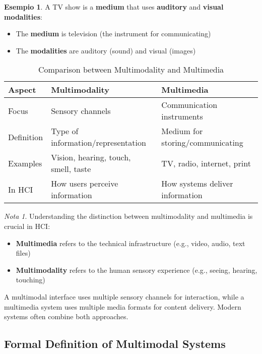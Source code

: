 \documentclass[11pt,a4paper]{article}
\theoremstyle{definition}
\newtheorem{example}{Esempio}[section]
\theoremstyle{plain}
\theoremstyle{remark}
\newtheorem*{remark}{Nota}
\begin{document}
\begin{example}
A TV show is a \textbf{medium} that uses \textbf{auditory} and \textbf{visual modalities}:
\begin{itemize}
    \item The \textbf{medium} is television (the instrument for communicating)
    \item The \textbf{modalities} are auditory (sound) and visual (images)
\end{itemize}
\end{example}

\begin{table}[h]
\centering
\begin{tabular}{|l|p{5cm}|p{5cm}|}
\hline
\textbf{Aspect} & \textbf{Multimodality} & \textbf{Multimedia} \\
\hline
Focus & Sensory channels & Communication instruments \\
\hline
Definition & Type of information/representation & Medium for storing/communicating \\
\hline
Examples & Vision, hearing, touch, smell, taste & TV, radio, internet, print \\
\hline
In HCI & How users perceive information & How systems deliver information \\
\hline
\end{tabular}
\caption{Comparison between Multimodality and Multimedia}
\end{table}

\begin{remark}
Understanding the distinction between multimodality and multimedia is crucial in HCI:
\begin{itemize}
    \item \textbf{Multimedia} refers to the technical infrastructure (e.g., video, audio, text files)
    \item \textbf{Multimodality} refers to the human sensory experience (e.g., seeing, hearing, touching)
\end{itemize}

A multimodal interface uses multiple sensory channels for interaction, while a multimedia system uses multiple media formats for content delivery. Modern systems often combine both approaches.
\end{remark}

\subsection{Formal Definition of Multimodal Systems}
\end{document}
